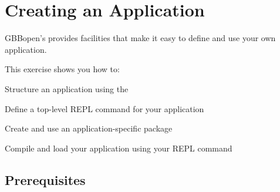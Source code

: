 \documentclass[10pt,twoside,english,pdftex]{article}
\begin{document}

\T\markright{}%
\T\pagestyle{plain}
\T\cleardoublepage
\W{}
\T\pagestyle{fancy}
\T\thispagestyle{fancybottom}
\T\renewcommand{\headrulewidth}{0pt}
\section{Creating an Application}
\label{sec:application}%

GBBopen's  provides
facilities that make it easy to define and use your own application.

\fndocrule

This exercise shows you how to:
\begin{tightitemize}
\item Structure an application using the 
\item Define a top-level REPL command for your application
\item Create and use an application-specific package
\item Compile and load your application using your REPL command
\end{tightitemize}

\fndocrule

\subsection*{Prerequisites}
\end{document}

